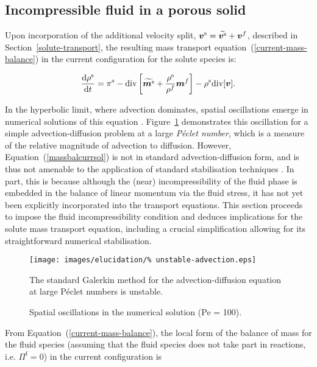 \subsection{Incompressible fluid in a porous solid}
\label{incompressible-fluid-porous-solid}

Upon incorporation of the additional velocity split,
$\mbox{\boldmath$ v$}^\mathrm{s}=\widetilde{\mbox{\boldmath$ v$}^\mathrm{s}}+\mbox{\boldmath$ v$}^f$, described in
Section~\ref{solute-transport}, the resulting mass transport
equation~(\ref{current-mass-balance}) in the current configuration for
the solute species is:

\begin{equation}
\frac{\mathrm{d}\rho^\mathrm{s}}{\mathrm{d}t} = \pi^\mathrm{s}-
\mathrm{div} \left[\widetilde{\mbox{\boldmath$ m$}^\mathrm{s}}+
  \frac{\rho^\mathrm{s}}{\rho^f}\mbox{\boldmath$ m$}^f\right] - \rho^\mathrm{s}
\mathrm{div}[\mbox{\boldmath$ v$}].
\label{massbalcurrsol}
\end{equation}

\noindent In the hyperbolic limit, where advection dominates, spatial
oscillations emerge in numerical solutions of this equation
\citep{Brooks:82,Paper6}. Figure~\ref{unstable-solution} demonstrates
this oscillation for a simple advection-diffusion problem at a large
{\em P\'eclet number}, which is a measure of the relative magnitude of
advection to diffusion. However, Equation~(\ref{massbalcurrsol}) is
not in standard advection-diffusion form, and is thus not amenable to
the application of standard stabilisation techniques
\citep{Paper6}. In part, this is because although the (near)
incompressibility of the fluid phase is embedded in the balance of
linear momentum via the fluid stress, it has not yet been explicitly
incorporated into the transport equations. This section proceeds to
impose the fluid incompressibility condition and deduces implications
for the solute mass transport equation, including a crucial
simplification allowing for its straightforward numerical
stabilisation.

\begin{figure}
  \begin{center}
  \texttt{[image: images/elucidation/\%
    unstable-advection.eps]}
  \caption{Spatial oscillations in the numerical solution (Pe = 100).}
  \label{unstable-solution}
  \end{center}
  {The standard Galerkin method for the advection-diffusion equation
    at large P\'eclet numbers is unstable.}
\end{figure}

From \mbox{Equation (\ref{current-mass-balance})}, the local form of
the balance of mass for the fluid species (assuming that the fluid
species does not take part in reactions, i.e. $\Pi^\mathrm{f}=0$) in
the current configuration is

